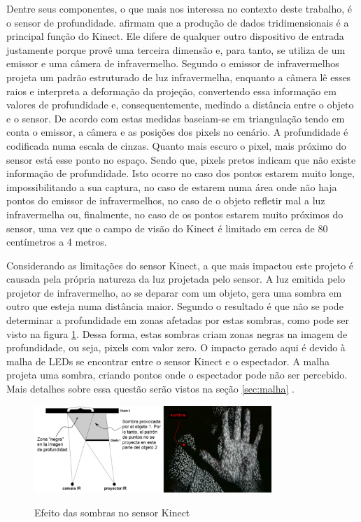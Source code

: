 Dentre seus componentes, o que mais nos interessa no contexto deste trabalho, é o sensor de profundidade.  afirmam que a produção de dados tridimensionais é a principal função do Kinect. Ele difere de qualquer outro dispositivo de entrada justamente porque provê uma terceira dimensão e, para tanto, se utiliza de um emissor e uma câmera de infravermelho. Segundo  o emissor de infravermelhos projeta um padrão estruturado de luz infravermelha, enquanto a câmera lê esses raios e interpreta a deformação da projeção, convertendo essa informação em valores de profundidade e, consequentemente, medindo a distância entre o objeto e o sensor. De acordo com  estas medidas baseiam-se em triangulação tendo em conta o emissor, a câmera e as posições dos pixels no cenário. A profundidade é codificada numa escala de cinzas. Quanto mais escuro o pixel, mais próximo do sensor está esse ponto no espaço. Sendo que, pixels pretos indicam que não existe informação de profundidade. Isto ocorre no caso dos pontos estarem muito longe, impossibilitando a sua captura, no caso de estarem numa área onde não haja pontos do emissor de infravermelhos, no caso de o objeto refletir mal a luz infravermelha ou, finalmente, no caso de os pontos estarem muito próximos do sensor, uma vez que o campo de visão do Kinect é limitado em cerca de 80 centímetros a 4 metros.

Considerando as limitações do sensor Kinect, a que mais impactou este projeto é causada pela própria natureza da luz projetada pelo sensor. A luz emitida pelo projetor de infravermelho, ao se deparar com um objeto, gera uma sombra em outro que esteja numa distância maior. Segundo  o resultado é que não se pode determinar a profundidade em zonas afetadas por estas sombras, como pode ser visto na figura \ref{fig:kinect_sombras}. Dessa forma, estas sombras criam zonas negras na imagem de profundidade, ou seja, pixels com valor zero. O impacto gerado aqui é devido à malha de LEDs se encontrar entre o sensor Kinect e o espectador. A malha projeta uma sombra, criando pontos onde o espectador pode não ser percebido.  Mais detalhes sobre essa questão serão vistos na seção \ref{sec:malha} .

\begin{figure}[H]
    \centering
    \caption{Efeito das sombras no sensor Kinect}
	\vspace*{0,2cm}
    \includegraphics[width=0.8\textwidth]{./04-figuras/kinect_sombras}
    \label{fig:kinect_sombras}
\end{figure}
\vspace*{-0,9cm}
{\raggedright {}}\\


